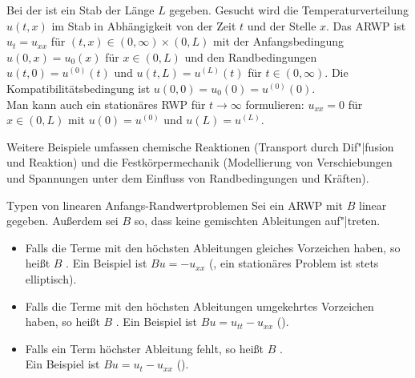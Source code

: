 \begin{Bsp}
    Bei der  ist ein Stab
    der Länge $L$ gegeben.
    Gesucht wird die Temperaturverteilung $u(t, x)$ im Stab in Abhängigkeit
    von der Zeit $t$ und der Stelle $x$.
    Das ARWP ist $u_t = u_{xx}$ für $(t, x) \in (0, \infty) \times (0, L)$ mit
    der Anfangsbedingung $u(0, x) = u_0(x)$ für $x \in (0, L)$ und den
    Randbedingungen $u(t, 0) = u^{(0)}(t)$ und $u(t, L) = u^{(L)}(t)$
    für $t \in (0, \infty)$.
    Die Kompatibilitätsbedingung ist $u(0, 0) = u_0(0) = u^{(0)}(0)$.\\
    Man kann auch ein stationäres RWP für $t \to \infty$ formulieren:
    $u_{xx} = 0$ für $x \in (0, L)$ mit
    $u(0) = u^{(0)}$ und $u(L) = u^{(L)}$.
\end{Bsp}

\begin{Bsp}
    Weitere Beispiele umfassen chemische Reaktionen
    (Transport durch Dif"|fusion und Reaktion) und die Festkörpermechanik
    (Modellierung von Verschiebungen und Spannungen unter dem Einfluss von
    Randbedingungen und Kräften).
\end{Bsp}

\linie

\begin{Def}{Typen von linearen Anfangs-Randwertproblemen}
    Sei ein ARWP mit $B$ linear gegeben.
    Außerdem sei $B$ so, dass keine gemischten Ableitungen auf"|treten.
    \begin{itemize}
        \item
        Falls die Terme mit den höchsten Ableitungen gleiches Vorzeichen
        haben, so heißt $B$ .
        Ein Beispiel ist $Bu = -u_{xx}$
        (,
        ein stationäres Problem ist stets elliptisch).
        
        \item
        Falls die Terme mit den höchsten Ableitungen umgekehrtes Vorzeichen
        haben, so heißt $B$ .
        Ein Beispiel ist $Bu = u_{tt} - u_{xx}$
        ().
        
        \item
        Falls ein Term höchster Ableitung fehlt,
        so heißt $B$ .\\
        Ein Beispiel ist $Bu = u_t - u_{xx}$
        ().
    \end{itemize}
\end{Def}

